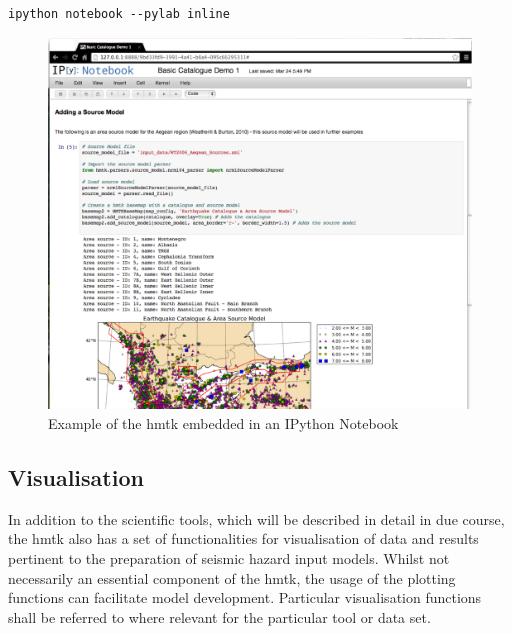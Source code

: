 \begin{Verbatim}[frame=single, commandchars=\\\{\}, fontsize=\scriptsize]
ipython notebook --pylab inline
\end{Verbatim}

\begin{figure}[htb]
  \centering
      \includegraphics[width=\textwidth]{./figures/hmtk_notebook_screenshot.eps}
  \caption{Example of the hmtk embedded in an IPython Notebook}
  \label{fig:notebook}
\end{figure}


%
%

\subsection{Visualisation}

In addition to the scientific tools, which will be described in detail in due course, the hmtk also has a set of functionalities for visualisation of data and results pertinent to the preparation of seismic hazard input models. Whilst not necessarily an essential component of the hmtk, the usage of the plotting functions can facilitate model development. Particular visualisation functions shall be referred to where relevant for the particular tool or data set. 

